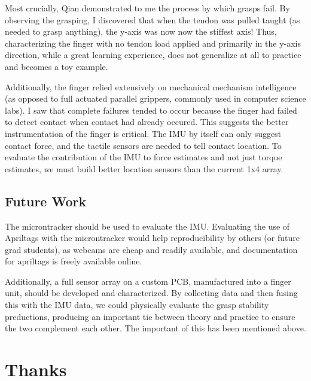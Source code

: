 \documentclass[preprint,12pt,3p]{elsarticle}
\begin{document}
Most crucially, Qian demonstrated to me the process by which grasps fail. By observing the grasping,
I discovered that when the tendon was pulled taught (as needed to grasp anything), the y-axis was now
now the stiffest axis! Thus, characterizing the finger with no tendon load applied and primarily in
the y-axis direction, while a great learning experience, does not generalize at all to practice and becomes a
toy example.

Additionally, the finger relied extensively on mechanical mechanism intelligence (as opposed to full
actuated parallel grippers, commonly used in computer science labs).  I saw that complete failures
tended to occur because the finger had failed to detect contact when contact had already occured.
This suggests the better instrumentation of the finger is critical. The IMU by itself can only
suggest contact force, and the tactile sensors are needed to tell contact location. To evaluate the
contribution of the IMU to force estimates and not just torque estimates, we must build better
location sensors than the current 1x4 array.


%
%

\subsection{Future Work}

The microntracker should be used to evaluate the IMU. Evaluating the use of Apriltags with the
microntracker would help reproducibility by others (or future grad students), as webcams are cheap
and readily available, and documentation for apriltags is freely available online.

Additionally, a full sensor array on a custom PCB, manufactured into a finger unit, should be
developed and characterized. By collecting data and then fusing this with the IMU data, we could
physically evaluate the grasp stability preductions, producing an important tie between theory and
practice to ensure the two complement each other. The important of this has been mentioned above.

\section{Thanks}
\end{document}
